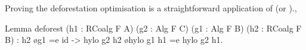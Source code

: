 \documentclass[a4paper,UKenglish,cleveref, autoref, thm-restate]{lipics-v2021}
\begin{document}

Proving the deforestation optimisation is a straightforward application
of  (or ).,
\begin{coqcode}
Lemma deforest (h1 : RCoalg F A) (g2 : Alg F C) (g1 : Alg F B) (h2 : RCoalg F B)
  : h2 \o g1 =e id -> hylo g2 h2 \o hylo g1 h1 =e hylo g2 h1.
\end{coqcode}
\end{document}
